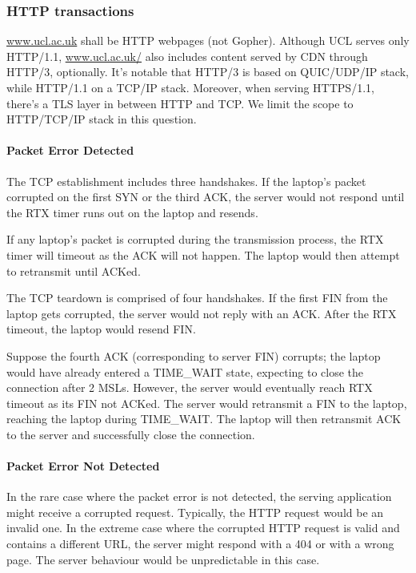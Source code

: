 \documentclass[12pt]{article}
\begin{document}
\subsubsection{HTTP transactions}

\url{www.ucl.ac.uk} shall be HTTP webpages (not Gopher). Although UCL serves only HTTP/1.1, \url{www.ucl.ac.uk/} also includes content served by CDN through HTTP/3, optionally. It's notable that HTTP/3 is based on QUIC/UDP/IP stack, while HTTP/1.1 on a TCP/IP stack. Moreover, when serving HTTPS/1.1, there's a TLS layer in between HTTP and TCP. We limit the scope to HTTP/TCP/IP stack in this question.

\paragraph{Packet Error Detected}

The TCP establishment includes three handshakes. If the laptop's packet corrupted on the first SYN or the third ACK, the server would not respond until the RTX timer runs out on the laptop and resends.

If any laptop's packet is corrupted during the transmission process, the RTX timer will timeout as the ACK will not happen. The laptop would then attempt to retransmit until ACKed.

The TCP teardown is comprised of four handshakes. If the first FIN from the laptop gets corrupted, the server would not reply with an ACK. After the RTX timeout, the laptop would resend FIN.

Suppose the fourth ACK (corresponding to server FIN) corrupts; the laptop would have already entered a TIME\_WAIT state, expecting to close the connection after 2 MSLs. However, the server would eventually reach RTX timeout as its FIN not ACKed. The server would retransmit a FIN to the laptop, reaching the laptop during TIME\_WAIT. The laptop will then retransmit ACK to the server and successfully close the connection.

\paragraph{Packet Error Not Detected}

In the rare case where the packet error is not detected, the serving application might receive a corrupted request. Typically, the HTTP request would be an invalid one. In the extreme case where the corrupted HTTP request is valid and contains a different URL, the server might respond with a 404 or with a wrong page. The server behaviour would be unpredictable in this case.
\end{document}
